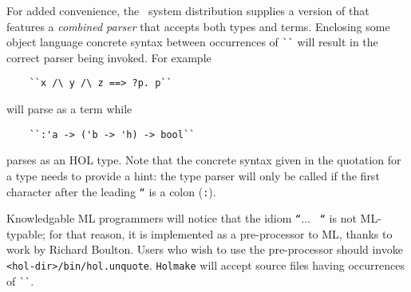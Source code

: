 For added convenience, the \HOL\ system distribution supplies a version 
of \holn{} that features a {\it combined parser\/} that accepts both types
and terms. Enclosing some object language concrete syntax between
occurrences of \verb+``+ will result in the correct parser being
invoked. For example  

\begin{verbatim}
    ``x /\ y /\ z ==> ?p. p``
\end{verbatim}

\noindent will parse as a term while

\begin{verbatim}
    ``:'a -> ('b -> 'h) -> bool``
\end{verbatim}

\noindent parses as an HOL type. Note that the concrete syntax given in
the quotation for a type needs to provide a hint: the type parser will
only be called if the first character after the leading {\tt ``} is a
colon (\verb+:+). 

Knowledgable ML programmers will notice that the idiom {\tt ``}$\ldots$ {\tt
  ``} is not ML-typable; for that reason, it is implemented as a
  pre-processor to ML, thanks to work by Richard Boulton. Users who wish
  to use the pre-processor should invoke {\tt
  <hol-dir>/bin/hol.unquote}. {\small\verb+Holmake+} will accept
  source files having occurrences of \verb+``+.

